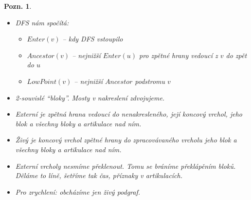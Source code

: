 \documentclass{article}
\theoremstyle{noparens}
\theoremstyle{noparens-mys}
\theoremstyle{noparens-note}
\newtheorem*{note}{Pozn.}
\begin{document}
\begin{note}
    ~

    \begin{itemize}
        \item DFS nám spočítá:
        \begin{itemize}
            \item $Enter(v)$ -- kdy DFS vstoupilo
            \item $Ancestor(v)$ -- nejnižší $Enter(u)$ pro zpětné hrany vedoucí z
                $v$ do zpět do $u$
            \item $LowPoint(v)$ -- nejnižší $Ancestor$ podstromu $v$
        \end{itemize}

        \item 2-souvislé \enquote{bloky}.  Mosty v nakreslení zdvojujeme.

        \item \emph{Externí} je zpětná hrana vedoucí do nenakresleného, její
            koncový vrchol, jeho blok a všechny bloky a artikulace nad ním.

        \item \emph{Živý} je koncový vrchol zpětné hrany do zpracovávaného vrcholu
            jeho blok a všechny bloky a artikulace nad ním.

        \item Externí vrcholy nesmíme překlenout. Tomu se bráníme překlápěním
            bloků. Děláme to líně, šetříme tak čas, příznaky v artikulacích.

        \item Pro zrychlení: obcházíme jen živý podgraf.
    \end{itemize}
\end{note}
\end{document}
